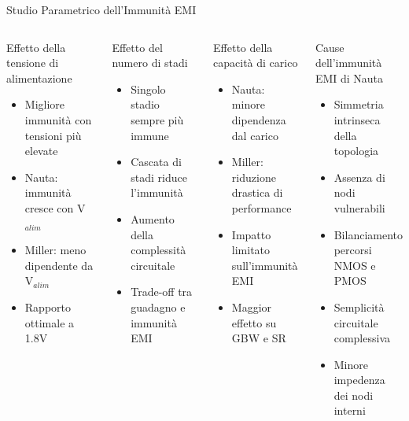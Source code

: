 \documentclass[aspectratio=169, 9pt]{beamer}
\begin{document}
\begin{frame}{Studio Parametrico dell'Immunità EMI}
    \begin{columns}
        \begin{block}{Effetto della tensione di alimentazione}
            \begin{itemize}\small
                \item Migliore immunità con tensioni più elevate
                \item Nauta: immunità cresce con V$_{alim}$
                \item Miller: meno dipendente da V$_{alim}$
                \item Rapporto ottimale a 1.8V
            \end{itemize}
        \end{block}
        
        \begin{block}{Effetto del numero di stadi}
            \begin{itemize}\small
                \item Singolo stadio sempre più immune
                \item Cascata di stadi riduce l'immunità
                \item Aumento della complessità circuitale
                \item Trade-off tra guadagno e immunità EMI
            \end{itemize}
        \end{block}
        
        \begin{block}{Effetto della capacità di carico}
            \begin{itemize}\small
                \item Nauta: minore dipendenza dal carico
                \item Miller: riduzione drastica di performance
                \item Impatto limitato sull'immunità EMI
                \item Maggior effetto su GBW e SR
            \end{itemize}
        \end{block}
        
        \begin{alertblock}{Cause dell'immunità EMI di Nauta}
            \begin{itemize}\small
                \item Simmetria intrinseca della topologia
                \item Assenza di nodi vulnerabili
                \item Bilanciamento percorsi NMOS e PMOS
                \item Semplicità circuitale complessiva
                \item Minore impedenza dei nodi interni
            \end{itemize}
        \end{alertblock}
    \end{columns}
\end{frame}
\end{document}
